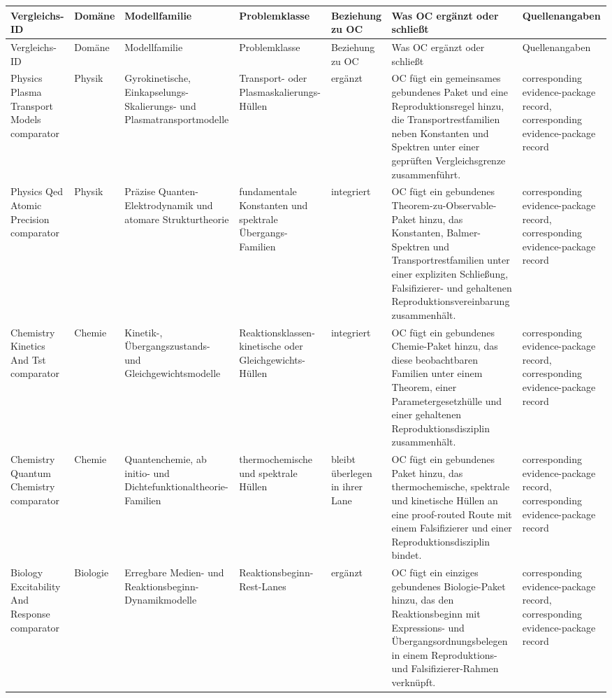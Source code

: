 \begin{longtable}{@{}L{0.14\textwidth}L{0.09\textwidth}L{0.14\textwidth}L{0.12\textwidth}L{0.10\textwidth}L{0.18\textwidth}L{0.15\textwidth}@{}}
\toprule
Vergleichs-ID & Domäne & Modellfamilie & Problemklasse & Beziehung zu OC & Was OC ergänzt oder schließt & Quellenangaben \\
\midrule
\endfirsthead
\toprule
Vergleichs-ID & Domäne & Modellfamilie & Problemklasse & Beziehung zu OC & Was OC ergänzt oder schließt & Quellenangaben \\
\midrule
\endhead
Physics Plasma Transport Models comparator & Physik & Gyrokinetische, Einkapselungs-Skalierungs- und Plasmatransportmodelle & Transport- oder Plasmaskalierungs-Hüllen & ergänzt & OC fügt ein gemeinsames gebundenes Paket und eine Reproduktionsregel hinzu, die Transportrestfamilien neben Konstanten und Spektren unter einer geprüften Vergleichsgrenze zusammenführt. & corresponding evidence-package record, corresponding evidence-package record \\
Physics Qed Atomic Precision comparator & Physik & Präzise Quanten-Elektrodynamik und atomare Strukturtheorie & fundamentale Konstanten und spektrale Übergangs-Familien & integriert & OC fügt ein gebundenes Theorem-zu-Observable-Paket hinzu, das Konstanten, Balmer-Spektren und Transportrestfamilien unter einer expliziten Schließung, Falsifizierer- und gehaltenen Reproduktionsvereinbarung zusammenhält. & corresponding evidence-package record, corresponding evidence-package record \\
Chemistry Kinetics And Tst comparator & Chemie & Kinetik-, Übergangszustands- und Gleichgewichtsmodelle & Reaktionsklassen-kinetische oder Gleichgewichts-Hüllen & integriert & OC fügt ein gebundenes Chemie-Paket hinzu, das diese beobachtbaren Familien unter einem Theorem, einer Parametergesetzhülle und einer gehaltenen Reproduktionsdisziplin zusammenhält. & corresponding evidence-package record, corresponding evidence-package record \\
Chemistry Quantum Chemistry comparator & Chemie & Quantenchemie, ab initio- und Dichtefunktionaltheorie-Familien & thermochemische und spektrale Hüllen & bleibt überlegen in ihrer Lane & OC fügt ein gebundenes Paket hinzu, das thermochemische, spektrale und kinetische Hüllen an eine proof-routed Route mit einem Falsifizierer und einer Reproduktionsdisziplin bindet. & corresponding evidence-package record, corresponding evidence-package record \\
Biology Excitability And Response comparator & Biologie & Erregbare Medien- und Reaktionsbeginn-Dynamikmodelle & Reaktionsbeginn-Rest-Lanes & ergänzt & OC fügt ein einziges gebundenes Biologie-Paket hinzu, das den Reaktionsbeginn mit Expressions- und Übergangsordnungsbelegen in einem Reproduktions- und Falsifizierer-Rahmen verknüpft. & corresponding evidence-package record, corresponding evidence-package record \\

\end{longtable}
